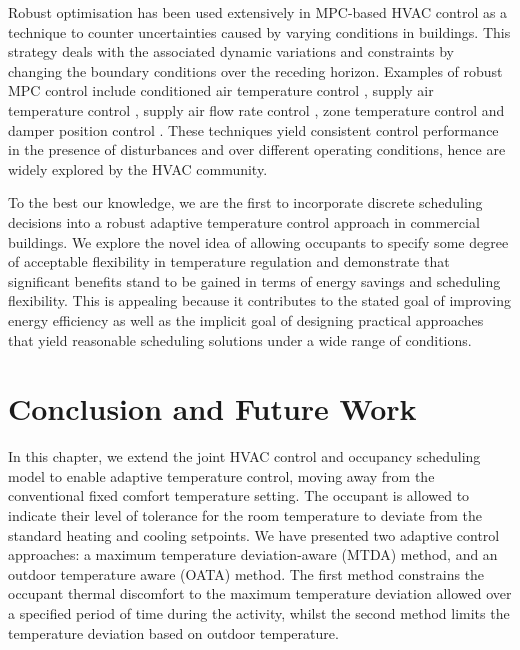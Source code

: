 Robust optimisation has been used extensively in MPC-based HVAC control as a technique to counter uncertainties caused by varying conditions in buildings. This strategy deals with the associated dynamic variations and constraints by changing the boundary conditions over the receding horizon. Examples of robust MPC control include conditioned air temperature control \citep{huang2009robust}, supply air temperature control \citep{anderson2008mimo}, supply air flow rate control \citep{anderson2008mimo}, zone temperature control \citep{al2004robust,huang2011Model} and damper position control \citep{huang2011Model}. These techniques yield consistent control performance in the presence of disturbances and over different operating conditions, hence are widely explored by the HVAC community. 

To the best our knowledge, we are the first to incorporate discrete scheduling decisions into a robust adaptive temperature control approach in  commercial buildings. We explore the novel idea of allowing occupants to specify some degree of acceptable flexibility in temperature regulation and demonstrate that significant benefits stand to be gained in terms of energy savings and scheduling flexibility. This is appealing because it contributes to the stated goal of improving energy efficiency as well as the implicit goal of designing practical approaches that yield reasonable scheduling solutions under a wide range of conditions. %


\section{Conclusion and Future Work}\label{sec:atc_conclusion}

In this chapter, we extend the joint HVAC control and occupancy scheduling model to enable adaptive temperature control, moving away from the conventional fixed comfort temperature setting. The occupant is allowed to indicate their level of tolerance for the room temperature to deviate from the standard heating and cooling setpoints. We have presented two adaptive control approaches: a maximum temperature deviation-aware (MTDA) method, and an outdoor temperature aware (OATA) method. The first method constrains the occupant thermal discomfort to the maximum temperature deviation allowed over a specified period of time during the activity, whilst the second method limits the temperature deviation based on outdoor temperature. 

